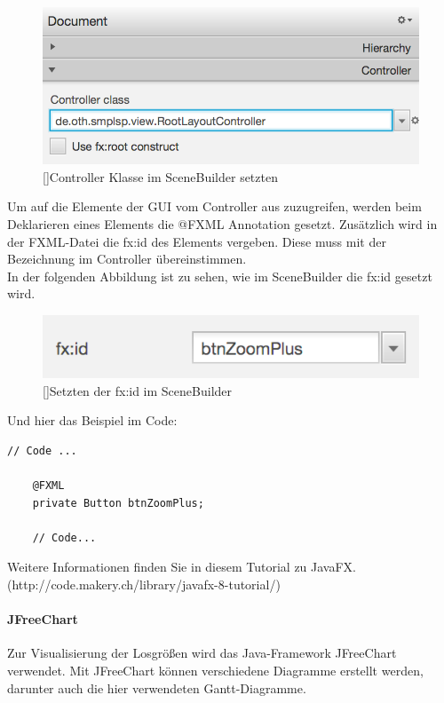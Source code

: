 \documentclass[12pt,a4paper, listof=entryprefix, bibliography=totocnumbered,toc=listofnumbered,lof=listofnumbered]{scrartcl}
\begin{document}
\begin{figure}[H]
	\centering
	\includegraphics[]{Bilder/controller_setzen.png} 
	[]{Controller Klasse im SceneBuilder setzten}
	\label{fig:osgi}
\end{figure}

Um auf die Elemente der \gls{GUI} vom Controller aus zuzugreifen, werden beim Deklarieren eines Elements die @FXML Annotation gesetzt. Zusätzlich wird in der FXML-Datei die fx:id des Elements vergeben. Diese muss mit der Bezeichnung im Controller übereinstimmen. 
\\
In der folgenden Abbildung ist zu sehen, wie im SceneBuilder die fx:id gesetzt wird.

\begin{figure}[H]
	\centering
	\includegraphics[]{Bilder/fxid.png} 
	[]{Setzten der fx:id im SceneBuilder}
	\label{fig:osgi}
\end{figure}

Und hier das Beispiel im Code:
\begin{lstlisting}[caption= Beispielprogramm, label=lst:code]
	// Code ...
	
	@FXML
	private Button btnZoomPlus; 
	
	// Code...
\end{lstlisting}

Weitere Informationen finden Sie in diesem Tutorial zu JavaFX.
\\
(http://code.makery.ch/library/javafx-8-tutorial/)

\paragraph{JFreeChart}
Zur Visualisierung der Losgrößen wird das Java-Framework JFreeChart verwendet. Mit JFreeChart können verschiedene Diagramme erstellt werden, darunter auch die hier verwendeten Gantt-Diagramme. 
\end{document}
